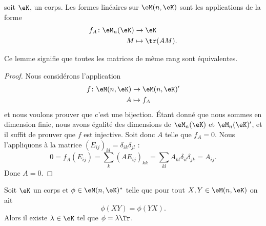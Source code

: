 \begin{proposition}     \label{PropHOjJpCa}
    soit \( \eK\), un corps. Les formes linéaires sur \( \eM(n,\eK)\) sont les applications de la forme
    \begin{equation}
        \begin{aligned}
            f_A\colon \eM_n(\eK)&\to \eK \\
            M&\mapsto \tr(AM). 
        \end{aligned}
    \end{equation}
\end{proposition}

Ce lemme signifie que toutes les matrices de même rang sont équivalentes.

\begin{proof}
    Nous considérons l'application
    \begin{equation}
        \begin{aligned}
            f\colon \eM(n,\eK)&\to \eM(n,\eK)' \\
            A&\mapsto f_A 
        \end{aligned}
    \end{equation}
    et nous voulons prouver que c'est une bijection. Étant donné que nous sommes en dimension finie, nous avons égalité des dimensions de \( \eM_n(\eK)\) et \( \eM_n(\eK)'\), et il suffit de prouver que \( f\) est injective. Soit donc \( A\) telle que \( f_A=0\). Nous l'appliquons à la matrice \( (E_{ij})_{kl}=\delta_{ik}\delta_{jl}\) :
    \begin{equation}
            0=f_A(E_{ij})
            =\sum_{k}(AE_{ij})_{kk}
            =\sum_{kl}A_{kl}\delta_{il}\delta_{jk}
            =A_{ij}.
    \end{equation}
    Donc \( A=0\).
\end{proof}

\begin{corollary}
    Soit \( \eK\) un corps et \( \phi\in\eM(n,\eK)^*\) telle que pour tout \( X,Y\in \eM(n,\eK)\) on ait
    \begin{equation}
        \phi(XY)=\phi(YX).
    \end{equation}
    Alors il existe \( \lambda\in \eK\) tel que \( \phi=\lambda\Tr\).
\end{corollary}

